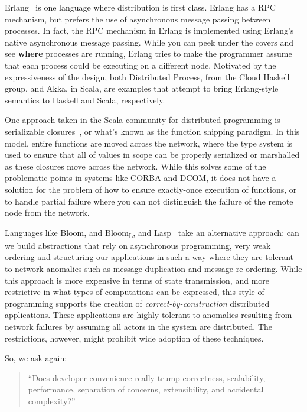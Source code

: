 Erlang~\cite{claessen2005semantics, svensson2007more, svensson2007programming} is one language where distribution is first class.  Erlang has a RPC mechanism, but prefers the use of asynchronous message passing between processes.  In fact, the RPC mechanism in Erlang is implemented using Erlang's native asynchronous message passing.  While you can peek under the covers and see \textbf{where} processes are running, Erlang tries to make the programmer assume that each process could be executing on a different node.  Motivated by the expressiveness of the design, both Distributed Process, from the Cloud Haskell group, and Akka, in Scala, are examples that attempt to bring Erlang-style semantics to Haskell and Scala, respectively.

One approach taken in the Scala community for distributed programming is serializable closures~\cite{miller2014spores}, or what's known as the function shipping paradigm.  In this model, entire functions are moved across the network, where the type system is used to ensure that all of values in scope can be properly serialized or marshalled as these closures move across the network.  While this solves some of the problematic points in systems like CORBA and DCOM, it does not have a solution for the problem of how to ensure exactly-once execution of functions, or to handle partial failure where you can not distinguish the failure of the remote node from the network.

Languages like Bloom, and Bloom\textsubscript{L}, and Lasp~\cite{alvaro2011consistency, conway2012logic, meiklejohn2015lasp} take an alternative approach: can we build abstractions that rely on asynchronous programming, very weak ordering and structuring our applications in such a way where they are tolerant to network anomalies such as message duplication and message re-ordering.  While this approach is more expensive in terms of state transmission, and more restrictive in what types of computations can be expressed, this style of programming supports the creation of \textit{correct-by-construction} distributed applications.  These applications are highly tolerant to anomalies resulting from network failures by assuming all actors in the system are distributed.  The restrictions, however, might prohibit wide adoption of these techniques.

So, we ask again:

\begin{quote}
``Does developer convenience really trump correctness, scalability,
performance, separation of concerns, extensibility, and accidental
complexity?''~\cite{vinoski2008convenience}
\end{quote}